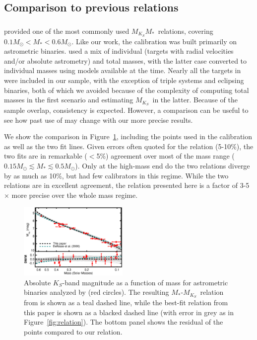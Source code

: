 \documentclass[twocolumn]{aastex62}
\newcommand{\mks}{$M_{K_S}$}
\newcommand{\mmk}{$M_{K_S}$\textendash$M_*$}
\begin{document}
\subsection{Comparison to previous relations}\label{sec:other}

\subsubsection{\citet{Delfosse2000}}

\citet{Delfosse2000} provided one of the most commonly used \mmk\ relations, covering $0.1M_\odot<M_*<0.6M_\odot$. Like our work, the calibration was built primarily on astrometric binaries. \citet{Delfosse2000} used a mix of individual (targets with radial velocities and/or absolute astrometry) and total masses, with the latter case converted to individual masses using models available at the time. Nearly all the targets in \citet{Delfosse2000} were included in our sample, with the exception of triple systems and eclipsing binaries, both of which we avoided because of the complexity of computing total masses in the first scenario and estimating \mks\ in the latter. Because of the sample overlap, consistency is expected. However, a comparison can be useful to see how past use of \citet{Delfosse2000} may change with our more precise results.

We show the comparison in Figure~\ref{fig:delfosse}, including the points used in the \citet{Delfosse2000} calibration as well as the two fit lines. Given errors often quoted for the \citet{Delfosse2000} relation (5-10\%), the two fits are in remarkable ($<$5\%) agreement over most of the mass range ($0.15M_\odot \lesssim M_* \lesssim 0.5M_\odot$). Only at the high-mass end do the two relations diverge by as much as 10\%, but \citet{Delfosse2000} had few calibrators in this regime. While the two relations are in excellent agreement, the relation presented here is a factor of 3-5$\times$ more precise over the whole mass regime. 

\begin{figure}[htb]
\begin{center}
\includegraphics[width=0.47\textwidth]{Delfosse_comp.eps}
\caption{Absolute $K_S$-band magnitude as a function of mass for astrometric binaries analyzed by \citet{Delfosse2000} (red circles). The resulting $M_*$-\mks\ relation from \citet{Delfosse2000} is shown as a teal dashed line, while the best-fit relation from this paper is shown as a blacked dashed line (with error in grey as in Figure~\ref{fig:relation}). The bottom panel shows the residual of the \citet{Delfosse2000} points compared to our relation.}
\label{fig:delfosse}
\end{center}
\end{figure}
\end{document}
